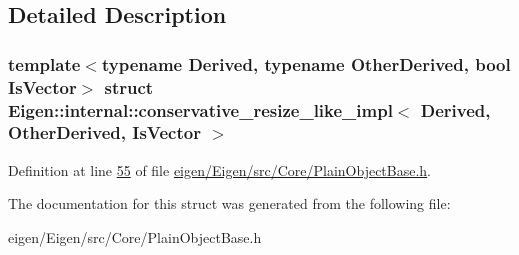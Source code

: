 \subsection{Detailed Description}
\subsubsection*{template$<$typename Derived, typename Other\+Derived, bool Is\+Vector$>$\newline
struct Eigen\+::internal\+::conservative\+\_\+resize\+\_\+like\+\_\+impl$<$ Derived, Other\+Derived, Is\+Vector $>$}



Definition at line \hyperlink{eigen_2_eigen_2src_2_core_2_plain_object_base_8h_source_l00055}{55} of file \hyperlink{eigen_2_eigen_2src_2_core_2_plain_object_base_8h_source}{eigen/\+Eigen/src/\+Core/\+Plain\+Object\+Base.\+h}.



The documentation for this struct was generated from the following file\+:\begin{DoxyCompactItemize}
\item 
eigen/\+Eigen/src/\+Core/\+Plain\+Object\+Base.\+h\end{DoxyCompactItemize}
